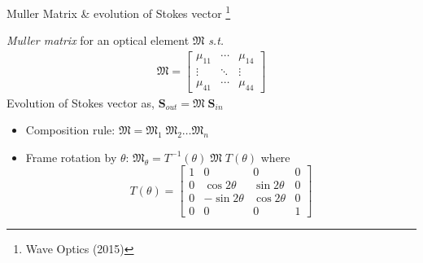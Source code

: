 \documentclass[12pt, dvipsnames]{beamer}
\numberwithin{equation}{section}
\newcommand\blfootnote[1]{%
	\begingroup
	\renewcommand\thefootnote{}\footnote{#1}%
	\addtocounter{footnote}{-1}%
	\endgroup
}
\begin{document}
\begin{frame}{Muller Matrix \& evolution of Stokes vector}\blfootnote{Wave Optics (2015)}
	\textit{Muller matrix} for an optical element $\boldsymbol{\mathfrak{M}}$ \textit{s.t.} 
	\begin{align*}\boldsymbol{\mathfrak{M}}=
		\begin{bmatrix}
			\mu_{11} & \cdots & \mu_{14}\\
			\vdots & \ddots & \vdots\\
			\mu_{41} & \cdots & \mu_{44}
		\end{bmatrix}
	\end{align*}\pause
	Evolution of Stokes vector as,
	$\boldsymbol{S}_{out}=\boldsymbol{\mathfrak{M}}\;\boldsymbol{S}_{in}$\pause
	\begin{itemize}
		\item Composition rule: $\boldsymbol{\mathfrak{M}}=\boldsymbol{\mathfrak{M}}_1\;\boldsymbol{\mathfrak{M}}_2 \dots {\boldsymbol{\mathfrak{M}}_n}$
		\item Frame rotation by $\theta$:
		$\boldsymbol{\mathfrak{M}}_\theta = T^{-1}(\theta)\;\boldsymbol{\mathfrak{M}}\;T(\theta)$ where $$			T(\theta)=
			\begin{bmatrix}
				1 & 0 & 0 & 0\\
				0 & \cos2\theta & \sin2\theta & 0 \\
				0 & -\sin2\theta & \cos2\theta & 0\\
				0 & 0 & 0 & 1
			\end{bmatrix}$$
	\end{itemize}
\end{frame}
\end{document}
